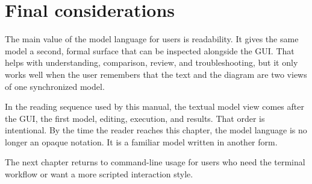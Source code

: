 \section{Final considerations}
\label{sec:model-language-final-considerations}

The main value of the model language for users is readability. It gives the
same model a second, formal surface that can be inspected alongside the GUI.
That helps with understanding, comparison, review, and troubleshooting, but it
only works well when the user remembers that the text and the diagram are two
views of one synchronized model.

In the reading sequence used by this manual, the textual model view comes after
the GUI, the first model, editing, execution, and results. That order is
intentional. By the time the reader reaches this chapter, the model language is
no longer an opaque notation. It is a familiar model written in another form.

The next chapter returns to command-line usage for users who need the terminal
workflow or want a more scripted interaction style.
